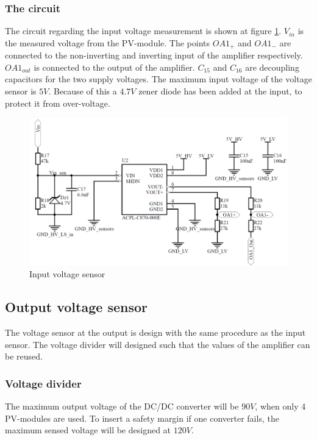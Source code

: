 \subsubsection{The circuit}
The circuit regarding the input voltage measurement is shown at figure \ref{fig:input_voltage_sensor_circuit}. $V_{in}$ is the measured voltage from the PV-module. The points $OA1_+$ and $OA1_-$ are connected to the non-inverting and inverting input of the amplifier respectively. $OA1_{out}$ is connected to the output of the amplifier. $C_{15}$ and $C_{16}$ are decoupling capacitors for the two supply voltages. The maximum input voltage of the voltage sensor is $5V$. Because of this a $4.7V$ zener diode has been added at the input, to protect it from over-voltage.

\begin{figure}[H]
	\begin{center}
		\includegraphics[width=0.7\linewidth]{../Pictures/P1/Sensors/input_voltage_sensor.PNG}
		\caption{Input voltage sensor}
		\label{fig:input_voltage_sensor_circuit}
	\end{center}
\end{figure}

\subsection{Output voltage sensor}
The voltage sensor at the output is design with the same procedure as the input sensor. The voltage divider will designed such that the values of the amplifier can be reused.

\subsubsection{Voltage divider}
The maximum output voltage of the DC/DC converter will be $90V$, when only 4 PV-modules are used. To insert a safety margin if one converter fails, the maximum sensed voltage will be designed at $120V$.

